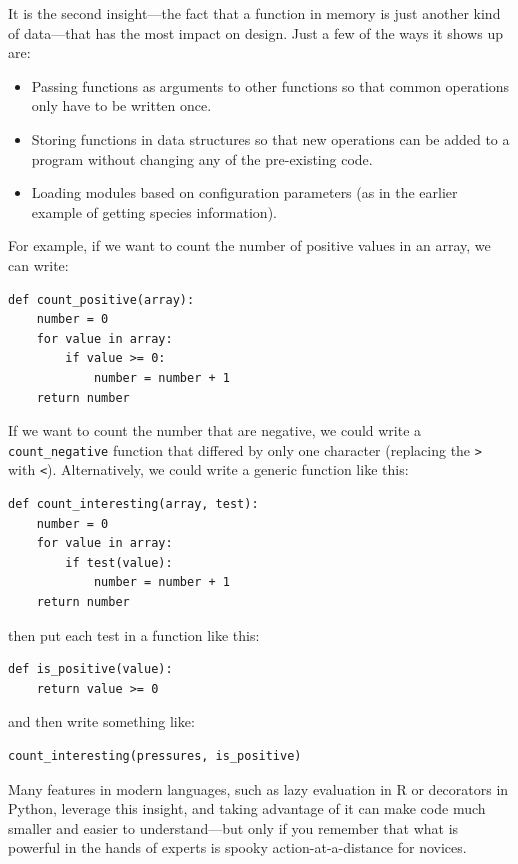 \documentclass[10pt,letterpaper]{article}
\begin{document}
It is the second insight---the fact that
a function in memory is just another kind of data---that has the most impact on design.
Just a few of the ways it shows up are:

\begin{itemize}
\item
  Passing functions as arguments to other functions
  so that common operations only have to be written once.
\item
  Storing functions in data structures
  so that new operations can be added to a program
  without changing any of the pre-existing code.
\item
  Loading modules based on configuration parameters
  (as in the earlier example of getting species information).
\end{itemize}

For example,
if we want to count the number of positive values in an array,
we can write:

\begin{lstlisting}
def count_positive(array):
    number = 0
    for value in array:
        if value >= 0:
            number = number + 1
    return number
\end{lstlisting}

If we want to count the number that are negative,
we could write a \texttt{count\_negative} function that differed by only one character
(replacing the \texttt{>} with \texttt{<}).
Alternatively,
we could write a generic function like this:

\begin{lstlisting}
def count_interesting(array, test):
    number = 0
    for value in array:
        if test(value):
            number = number + 1
    return number
\end{lstlisting}

\noindent
then put each test in a function like this:

\begin{lstlisting}
def is_positive(value):
    return value >= 0
\end{lstlisting}

\noindent
and then write something like:

\begin{lstlisting}
count_interesting(pressures, is_positive)
\end{lstlisting}

Many features in modern languages,
such as lazy evaluation in R or decorators in Python,
leverage this insight,
and taking advantage of it can make code much smaller
and easier to understand---but only if you remember that
what is powerful in the hands of experts is spooky action-at-a-distance for novices.
\end{document}
